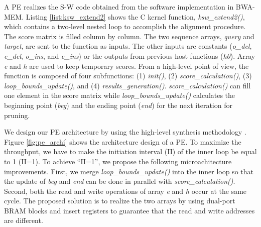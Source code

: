 A PE realizes the S-W code obtained from the software implementation in BWA-MEM. 
Listing \ref{list:ksw_extend2} shows the C kernel function, \textit{ksw\_extend2()}, 
which contains a two-level nested loop to accomplish the alignment procedure.
The score matrix is filled column by column.
The two sequence arrays, \textit{query} and \textit{target}, are sent to the function as inputs.
The other inputs are constants (\emph{o\_del}, \emph{e\_del}, \emph{o\_ins}, and \emph{e\_ins}) or the outputs from previous host functions (\emph{h0}).
Array \emph{e} and \emph{h} are used to keep temporary scores.
From a high-level point of view, the function is composed of four subfunctions: 
(1) \textit{init()}, (2) \textit{score\_calculation()}, (3) \textit{loop\_bounds\_update()}, and (4) \textit{results\_generation()}.
\textit{score\_calculation()} can fill one element in the score matrix
while \textit{loop\_bounds\_update()} calculates the beginning point (\emph{beg}) and the ending point (\emph{end}) for the next iteration for pruning.


We design our PE architecture by using the high-level synthesis methodology \cite{Cong2004}.
Figure \ref{fig:pe_archi} shows the architecture design of a PE.
To maximize the throughput, we have to make the initiation interval (II) of the inner loop be equal to 1 (II=1). 
To achieve ``II=1'', we propose the following microachitecture improvements. 
First, we merge \textit{loop\_bounds\_update()} into the inner loop so that the update of \emph{beg} and \emph{end} 
can be done in parallel with \textit{score\_calculation()}.
Second, both the read and write operations of array \emph{e} and \emph{h} occur at the same cycle.
The proposed solution is to realize the two arrays by using dual-port BRAM blocks
and insert registers to guarantee that the read and write addresses are different.

